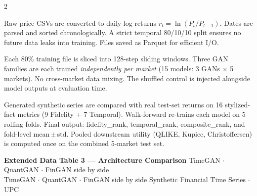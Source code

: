 \documentclass[10pt]{article}
\newcommand{\navybox}[2]{\begin{tcolorbox}[mybox={Navy}{LBg},title={#1}]#2\end{tcolorbox}}
\newcommand{\skybox}[2]{\begin{tcolorbox}[mybox={Sky}{BBg},title={#1}]#2\end{tcolorbox}}
\newcommand{\tealbox}[2]{\begin{tcolorbox}[mybox={Teal}{LBg},title={#1}]#2\end{tcolorbox}}
\newcommand{\pagehead}[2]{%
  \begin{tcolorbox}[enhanced,arc=0pt,outer arc=0pt,boxrule=0pt,
    colback=Navy,colframe=Navy,
    top=5pt,bottom=5pt,left=8pt,right=8pt,
    before skip=0pt,after skip=10pt]
  {\color{white}\large\bfseries #1}%
  \ifx\relax#2\relax\else\\[1pt]{\color{blue!30!white}\small #2}\fi
  \hfill{\color{blue!20!white}\footnotesize Synthetic Financial Time Series $\cdot$ UPC}
  \end{tcolorbox}}
\begin{document}
\vspace{6pt}
\begin{multicols}{2}
\small

\navybox{Stage 1 --- Data Preprocessing}{%
Raw price CSVs are converted to daily log returns $r_t = \ln(P_t/P_{t-1})$. Dates are parsed and sorted chronologically. A strict temporal 80/10/10 split ensures no future data leaks into training. Files saved as Parquet for efficient I/O.}

\skybox{Stage 2 --- GAN Training}{%
Each 80\% training file is sliced into 128-step sliding windows. Three GAN families are each trained \emph{independently per market} (15 models: 3 GANs $\times$ 5 markets). No cross-market data mixing. The shuffled control is injected alongside model outputs at evaluation time.}

\columnbreak

\tealbox{Stage 3 --- Evaluation}{%
Generated synthetic series are compared with real test-set returns on 16 stylized-fact metrics (9 Fidelity + 7 Temporal). Walk-forward re-trains each model on 5 rolling folds. Final output: fidelity\_rank, temporal\_rank, composite\_rank, and fold-level mean\,$\pm$\,std. Pooled downstream utility (QLIKE, Kupiec, Christoffersen) is computed once on the combined 5-market test set.}

\end{multicols}

\clearpage

\pagehead{Extended Data Table 3 --- Architecture Comparison}
         {TimeGAN $\cdot$ QuantGAN $\cdot$ FinGAN side by side}
\end{document}

